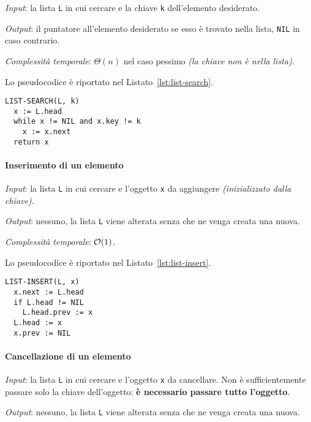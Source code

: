 \documentclass[italian, 10pt]{article}
\begin{document}
\textit{Input}: la lista \texttt{L} in cui cercare e la chiave \texttt{k} dell'elemento desiderato.

\textit{Output}: il puntatore all'elemento desiderato se esso è trovato nella lista, \texttt{NIL} in caso contrario.

\textit{Complessità temporale}: \(\Theta(n)\) nel caso pessimo \textit{(la chiave non è nella lista)}.

\bigskip
Lo pseudocodice è riportato nel Listato~\ref{lst:list-search}.

\begin{lstlisting}[style=pseudocode, caption={Pseudocodice dell'algoritmo \texttt{LIST-SEARCH}}, label={lst:list-search}]
LIST-SEARCH(L, k)
  x := L.head
  while x != NIL and x.key != k
    x := x.next
  return x
\end{lstlisting}

\paragraph{Inserimento di un elemento}

\textit{Input}: la lista \texttt{L} in cui cercare e l'oggetto \texttt{x} da aggiungere \textit{(inizializzato dalla chiave)}.

\textit{Output}: nessuno, la lista \texttt{L} viene alterata senza che ne venga creata una nuova.

\textit{Complessità temporale}: \(\mathcal{O}(1)\).

\bigskip
Lo pseudocodice è riportato nel Listato~\ref{lst:list-insert}.

\begin{lstlisting}[style=pseudocode, caption={Pseudocodice dell'algoritmo \texttt{LIST-INSERT}}, label={lst:list-insert}]
LIST-INSERT(L, x)
  x.next := L.head
  if L.head != NIL
    L.head.prev := x
  L.head := x
  x.prev := NIL
\end{lstlisting}

\paragraph{Cancellazione di un elemento}

\textit{Input}: la lista \texttt{L} in cui cercare e l'oggetto \texttt{x} da cancellare.
Non è sufficientemente passare solo la chiave dell'oggetto: \textbf{è necessario passare tutto l'oggetto}.

\textit{Output}: nessuno, la lista \texttt{L} viene alterata senza che ne venga creata una nuova.
\end{document}
